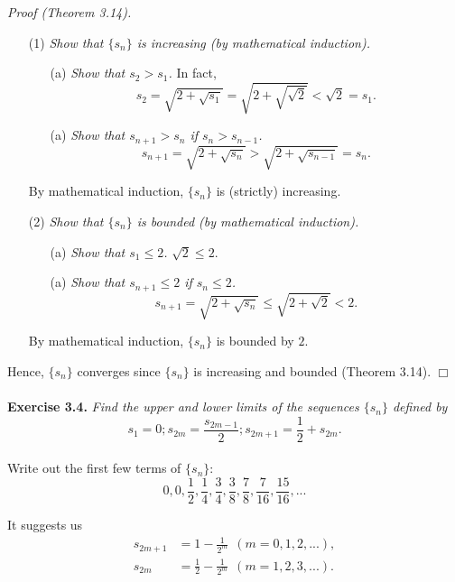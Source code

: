 \documentclass{article}
\begin{document}
\emph{Proof (Theorem 3.14).}
\begin{enumerate}
\item[(1)]
\emph{Show that $\{s_n\}$ is increasing (by mathematical induction).}
  \begin{enumerate}
  \item[(a)]
  \emph{Show that $s_2 > s_1$.}
  In fact,
  $$s_2 = \sqrt{2+\sqrt{s_1}} = \sqrt{2+\sqrt{\sqrt{2}}} < \sqrt{2} = s_1.$$
  \item[(a)]
  \emph{Show that $s_{n+1} > s_{n}$ if $s_{n} > s_{n-1}$.}
  $$s_{n+1} = \sqrt{2+\sqrt{s_{n}}} > \sqrt{2+\sqrt{s_{n-1}}} = s_n.$$
  \end{enumerate}
By mathematical induction, $\{s_n\}$ is (strictly) increasing.
\item[(2)]
\emph{Show that $\{s_n\}$ is bounded (by mathematical induction).}
  \begin{enumerate}
  \item[(a)]
  \emph{Show that $s_1 \leq 2$.}
  $\sqrt{2} \leq 2$.
  \item[(a)]
  \emph{Show that $s_{n+1} \leq 2$ if $s_{n} \leq 2$.}
  $$s_{n+1} = \sqrt{2+\sqrt{s_{n}}} \leq \sqrt{2+\sqrt{2}} < 2.$$
  \end{enumerate}
By mathematical induction, $\{s_n\}$ is bounded by $2$.
\end{enumerate}
Hence, $\{s_n\}$ converges since $\{s_n\}$ is increasing and bounded (Theorem 3.14).
$\Box$ \\\\






\textbf{Exercise 3.4.}
\emph{Find the upper and lower limits of the sequences $\{s_n\}$ defined by
$$s_1 = 0; s_{2m} = \frac{s_{2m-1}}{2}; s_{2m+1} = \frac{1}{2} + s_{2m}.$$ } \\

Write out the first few terms of $\{s_n\}$:
$$0, 0, \frac{1}{2}, \frac{1}{4}, \frac{3}{4},
\frac{3}{8}, \frac{7}{8}, \frac{7}{16}, \frac{15}{16}, ...$$

It suggests us
\begin{align*}
s_{2m+1} &= 1 - \frac{1}{2^m} \:\: (m = 0, 1, 2, ...), \\
s_{2m} &= \frac{1}{2} - \frac{1}{2^m} \:\: (m = 1, 2, 3, ...). \\
\end{align*}
\end{document}
